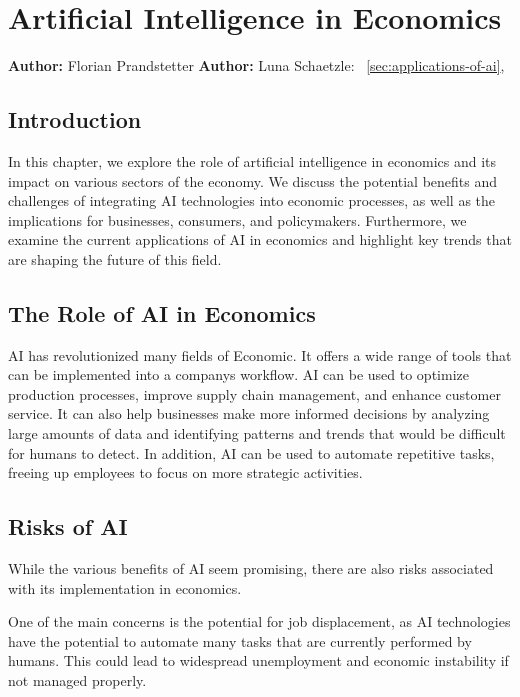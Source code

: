 \chapter{Artificial Intelligence in Economics}
\label{chap:Artificial_Intelligence_in_Economics}
\textbf{Author:} Florian Prandstetter
\textbf{Author:} Luna Schaetzle: ~\ref{sec:applications-of-ai}, 


\section{Introduction}

In this chapter, we explore the role of artificial intelligence in economics and its impact on various sectors of the economy. We discuss the potential benefits and challenges of integrating AI technologies into economic processes, as well as the implications for businesses, consumers, and policymakers. Furthermore, we examine the current applications of AI in economics and highlight key trends that are shaping the future of this field.


\section{The Role of AI in Economics}

AI has revolutionized many fields of Economic. It offers a wide range of tools that can be implemented into a companys workflow.
AI can be used to optimize production processes, improve supply chain management, and enhance customer service. It can also help businesses make more informed decisions by analyzing large amounts of data and identifying patterns and trends that would be difficult for humans to detect. In addition, AI can be used to automate repetitive tasks, freeing up employees to focus on more strategic activities.

\section{Risks of AI}
\label{sec:risks-of-ai}

While the various benefits of AI seem promising, there are also risks associated with its implementation in economics.

One of the main concerns is the potential for job displacement, as AI technologies have the potential to automate many tasks that are currently performed by humans. This could lead to widespread unemployment and economic instability if not managed properly. 

